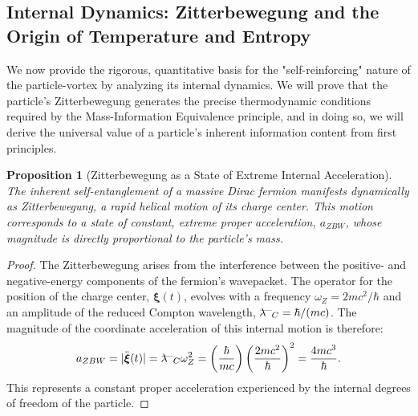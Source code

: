 \documentclass[11pt, letterpaper]{report}
\theoremstyle{plain} %
\newtheorem{proposition}[theorem]{Proposition}
\theoremstyle{definition} %
\theoremstyle{remark} %
\newcommand{\lambdabar}{\lambda \kern-0.5em \raise0.5ex\hbox{\char'26}} %
\begin{document}
\subsection{Internal Dynamics: Zitterbewegung and the Origin of Temperature and Entropy}
\label{sec:internal_dynamics_final}

We now provide the rigorous, quantitative basis for the "self-reinforcing" nature of the particle-vortex by analyzing its internal dynamics. We will prove that the particle's Zitterbewegung generates the precise thermodynamic conditions required by the Mass-Information Equivalence principle, and in doing so, we will derive the universal value of a particle's inherent information content from first principles.

\begin{proposition}[Zitterbewegung as a State of Extreme Internal Acceleration]
\label{prop:zbw_as_acceleration_final}
The inherent self-entanglement of a massive Dirac fermion manifests dynamically as Zitterbewegung, a rapid helical motion of its charge center. This motion corresponds to a state of constant, extreme proper acceleration, $a_{ZBW}$, whose magnitude is directly proportional to the particle's mass.
\end{proposition}
\begin{proof}
The Zitterbewegung arises from the interference between the positive- and negative-energy components of the fermion's wavepacket. The operator for the position of the charge center, $\boldsymbol{\xi}(t)$, evolves with a frequency $\omega_Z = 2mc^2/\hbar$ and an amplitude of the reduced Compton wavelength, $\lambdabar_C = \hbar/(mc)$. The magnitude of the coordinate acceleration of this internal motion is therefore:
\begin{equation}
    a_{ZBW} = |\ddot{\boldsymbol{\xi}}(t)| = \lambdabar_C \omega_Z^2 = \left(\frac{\hbar}{mc}\right) \left(\frac{2mc^2}{\hbar}\right)^2 = \frac{4mc^3}{\hbar}.
\end{equation}
This represents a constant proper acceleration experienced by the internal degrees of freedom of the particle.
\end{proof}
\end{document}
